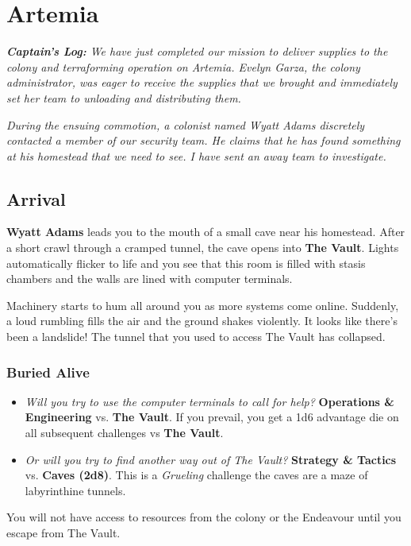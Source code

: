 \documentclass[11pt, a5paper, parskip=half-, DIV=12]{scrartcl}
\begin{document}
\section*{Artemia}
\textit{\textbf{Captain's Log:} We have just completed our mission to deliver supplies to the colony and terraforming operation on Artemia. Evelyn Garza, the colony administrator, was eager to receive the supplies that we brought and immediately set her team to unloading and distributing them.}

\textit{During the ensuing commotion, a colonist named Wyatt Adams discretely contacted a member of our security team. He claims that he has found something at his homestead that we need to see. I have sent an away team to investigate.}

\subsection*{Arrival}
\textbf{Wyatt Adams} leads you to the mouth of a small cave near his homestead. After a short crawl through a cramped tunnel, the cave opens into \textbf{The Vault}. Lights automatically flicker to life and you see that this room is filled with stasis chambers and the walls are lined with computer terminals.

Machinery starts to hum all around you as more systems come online. Suddenly, a loud rumbling fills the air and the ground shakes violently. It looks like there's been a landslide! The tunnel that you used to access The Vault has collapsed.

\subsubsection*{Buried Alive}
\begin{itemize}
	\item \textit{Will you try to use the computer terminals to call for help?} \textbf{Operations \& Engineering} vs. \textbf{The Vault}. If you prevail, you get a 1d6 advantage die on all subsequent challenges vs \textbf{The Vault}.
	\item \textit{Or will you try to find another way out of The Vault?} \textbf{Strategy \& Tactics} vs. \textbf{Caves (2d8)}. This is a \textit{Grueling} challenge \textendash{} the caves are a maze of labyrinthine tunnels.  
\end{itemize}

You will not have access to resources from the colony or the Endeavour until you escape from The Vault.
\newpage
\end{document}
